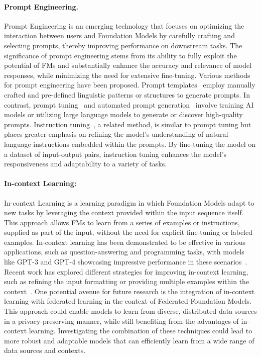 \paragraph{Prompt Engineering.} 
Prompt Engineering is an emerging technology that focuses on optimizing the interaction between users and Foundation Models by carefully crafting and selecting prompts, thereby improving performance on downstream tasks. The significance of prompt engineering stems from its ability to fully exploit the potential of FMs and substantially enhance the accuracy and relevance of model responses, while minimizing the need for extensive fine-tuning.
Various methods for prompt engineering have been proposed. Prompt templates~\cite{} employ manually crafted and pre-defined linguistic patterns or structures to generate prompts. In contrast, prompt tuning~\cite{} and automated prompt generation~\cite{} involve training AI models or utilizing large language models to generate or discover high-quality prompts. Instruction tuning~\cite{}, a related method, is similar to prompt tuning but places greater emphasis on refining the model's understanding of natural language instructions embedded within the prompts. By fine-tuning the model on a dataset of input-output pairs, instruction tuning enhances the model's responsiveness and adaptability to a variety of tasks.

\paragraph{In-context Learning:} 
In-context Learning is a learning paradigm in which Foundation Models adapt to new tasks by leveraging the context provided within the input sequence itself. This approach allows FMs to learn from a series of examples or instructions, supplied as part of the input, without the need for explicit fine-tuning or labeled examples. In-context learning has been demonstrated to be effective in various applications, such as question-answering and programming tasks, with models like GPT-3 and GPT-4 showcasing impressive performance in these scenarios~\cite{}.
Recent work has explored different strategies for improving in-context learning, such as refining the input formatting or providing multiple examples within the context~\cite{}. One potential avenue for future research is the integration of in-context learning with federated learning in the context of Federated Foundation Models. This approach could enable models to learn from diverse, distributed data sources in a privacy-preserving manner, while still benefiting from the advantages of in-context learning. Investigating the combination of these techniques could lead to more robust and adaptable models that can efficiently learn from a wide range of data sources and contexts.

